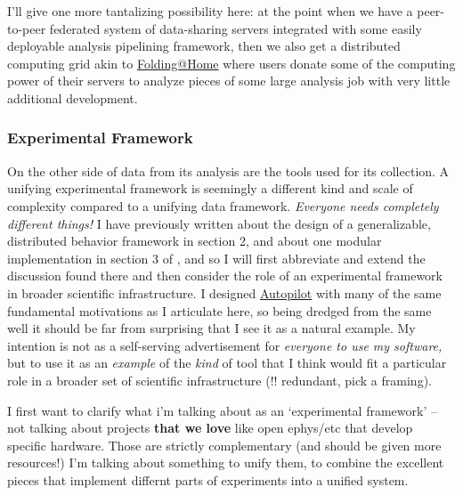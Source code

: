 \documentclass[11pt]{article}
\begin{document}
\begin{multicols}{2}
I'll give one more tantalizing possibility here: at the point when we
have a peer-to-peer federated system of data-sharing servers integrated
with some easily deployable analysis pipelining framework, then we also
get a distributed computing grid akin to
\href{https://foldingathome.org/}{Folding@Home} where users donate some
of the computing power of their servers to analyze pieces of some large
analysis job with very little additional development. 
\end{multicols}


\hypertarget{experimental-framework}{%
\subsubsection{Experimental Framework}\label{experimental-framework}}


\begin{multicols}{2}
 On the other side of data from its analysis are the tools
used for its collection. A unifying experimental framework is seemingly
a different kind and scale of complexity compared to a unifying data
framework. \emph{Everyone needs completely different things!} I have
previously written about the design of a generalizable, distributed
behavior framework in section 2, and about one modular implementation in
section 3 of \cite{saundersAutopilotAutomatingBehavioral2019} ,
and so I will first abbreviate and extend the discussion found there and
then consider the role of an experimental framework in broader
scientific infrastructure. I designed
\href{https://docs.auto-pi-lot.com}{Autopilot} with many of the same
fundamental motivations as I articulate here, so being dredged from the
same well it should be far from surprising that I see it as a natural
example. My intention is not as a self-serving advertisement for
\emph{everyone to use my software,} but to use it as an \emph{example}
of the \emph{kind} of tool that I think would fit a particular role in a
broader set of scientific infrastructure (!! redundant, pick a framing).

I first want to clarify what i'm talking about as an `experimental
framework' -- not talking about projects \textbf{that we love} like open
ephys/etc that develop specific hardware. Those are strictly
complementary (and should be given more resources!) I'm talking about
something to unify them, to combine the excellent pieces that implement
differnt parts of experiments into a unified system.


\end{multicols}
\end{document}
